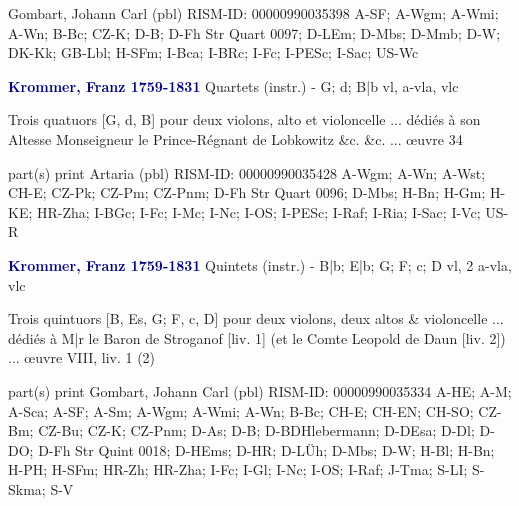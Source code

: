 \documentclass[twocolumn]{book}
\begin{document}
\newline Gombart, Johann Carl  (pbl)
\newline RISM-ID: 00000990035398
\newline A-SF; A-Wgm; A-Wmi; A-Wn; B-Bc; CZ-K; D-B; D-Fh  Str Quart 0097; D-LEm; D-Mbs; D-Mmb; D-W; DK-Kk; GB-Lbl; H-SFm; I-Bca; I-BRc; I-Fc; I-PESc; I-Sac; US-Wc
\newline \par \vspace{7pt} \textcolor{darkblue}{\textbf{Krommer, Franz  1759-1831}}
\newline Quartets (instr.) - G; d; B|b
 vl, a-vla, vlc
\newline \begin{itshape}Trois quatuors [G, d, B] pour deux violons, alto et violoncelle ... dédiés à son Altesse Monseigneur le Prince-Régnant de Lobkowitz \&c. \&c. ... œuvre 34\end{itshape} 
\newline \textcolor{darkblue}{}  part(s)
\newline print
\newline Artaria  (pbl)
\newline RISM-ID: 00000990035428
\newline A-Wgm; A-Wn; A-Wst; CH-E; CZ-Pk; CZ-Pm; CZ-Pnm; D-Fh  Str Quart 0096; D-Mbs; H-Bn; H-Gm; H-KE; HR-Zha; I-BGc; I-Fc; I-Mc; I-Nc; I-OS; I-PESc; I-Raf; I-Ria; I-Sac; I-Vc; US-R
\newline \par \vspace{7pt} \textcolor{darkblue}{\textbf{Krommer, Franz  1759-1831}}
\newline Quintets (instr.) - B|b; E|b; G; F; c; D
 vl, 2 a-vla, vlc
\newline \begin{itshape}Trois quintuors [B, Es, G; F, c, D] pour deux violons, deux altos \& violoncelle ... dédiés à M|r le Baron de Stroganof [liv. 1] (et le Comte Leopold de Daun [liv. 2]) ... œuvre VIII, liv. 1 (2)\end{itshape} 
\newline \textcolor{darkblue}{}  part(s)
\newline print
\newline Gombart, Johann Carl  (pbl)
\newline RISM-ID: 00000990035334
\newline A-HE; A-M; A-Sca; A-SF; A-Sm; A-Wgm; A-Wmi; A-Wn; B-Bc; CH-E; CH-EN; CH-SO; CZ-Bm; CZ-Bu; CZ-K; CZ-Pnm; D-As; D-B; D-BDHlebermann; D-DEsa; D-Dl; D-DO; D-Fh  Str Quint 0018; D-HEms; D-HR; D-LÜh; D-Mbs; D-W; H-Bl; H-Bn; H-PH; H-SFm; HR-Zh; HR-Zha; I-Fc; I-Gl; I-Nc; I-OS; I-Raf; J-Tma; S-LI; S-Skma; S-V
\end{document}
